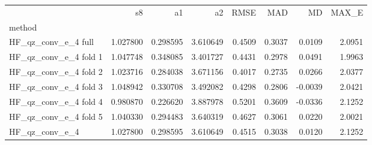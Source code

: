 \begin{tabular}{lrrrrrrr}
 & s8 & a1 & a2 & RMSE & MAD & MD & MAX_E \\
method &  &  &  &  &  &  &  \\
HF_qz_conv_e_4 full & 1.027800 & 0.298595 & 3.610649 & 0.4509 & 0.3037 & 0.0109 & 2.0951 \\
HF_qz_conv_e_4 fold 1 & 1.047748 & 0.348085 & 3.401727 & 0.4431 & 0.2978 & 0.0491 & 1.9963 \\
HF_qz_conv_e_4 fold 2 & 1.023716 & 0.284038 & 3.671156 & 0.4017 & 0.2735 & 0.0266 & 2.0377 \\
HF_qz_conv_e_4 fold 3 & 1.048942 & 0.330708 & 3.492082 & 0.4298 & 0.2806 & -0.0039 & 2.0421 \\
HF_qz_conv_e_4 fold 4 & 0.980870 & 0.226620 & 3.887978 & 0.5201 & 0.3609 & -0.0336 & 2.1252 \\
HF_qz_conv_e_4 fold 5 & 1.040330 & 0.294483 & 3.640319 & 0.4627 & 0.3061 & 0.0220 & 2.0021 \\
HF_qz_conv_e_4 & 1.027800 & 0.298595 & 3.610649 & 0.4515 & 0.3038 & 0.0120 & 2.1252 \\
\end{tabular}
